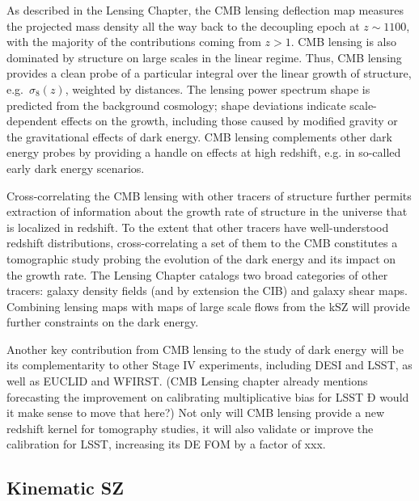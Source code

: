 As described in the Lensing Chapter, the CMB lensing deflection map measures the projected mass density all the way back to the decoupling epoch at $z \sim 1100$, with the majority of the contributions coming from $z > 1$.  CMB lensing is also dominated by structure on large scales in the linear regime.  Thus,  CMB lensing provides a clean probe of a particular integral over the linear growth of structure,
e.g.~$\sigma_8(z)$,
weighted by distances. The lensing power spectrum shape is predicted from the background cosmology; shape deviations indicate scale-dependent effects on the growth, including those caused by modified gravity or the 
gravitational effects of dark energy.  CMB lensing complements other dark energy probes by providing
a handle on effects at high redshift, e.g. in so-called early dark energy scenarios.

Cross-correlating the CMB lensing with other tracers of structure further permits extraction of information about the growth rate of structure in the universe that is localized in redshift.  To the extent that other tracers have well-understood redshift distributions, cross-correlating a set of them to the CMB constitutes a tomographic study probing the evolution of the dark energy and its impact on the growth rate. The Lensing Chapter catalogs two broad categories of other tracers: galaxy density fields (and by extension the CIB) and galaxy shear maps. Combining lensing maps with maps of large scale flows from the kSZ will provide further constraints on the dark energy.

Another key contribution from CMB lensing to the study of dark energy will be its complementarity to other Stage IV experiments, including DESI and LSST, as well as EUCLID and WFIRST. (CMB Lensing chapter already mentions forecasting the improvement on calibrating multiplicative bias for LSST Ð would it make sense to move that here?) Not only will CMB lensing provide a new redshift kernel for tomography studies, it will also validate or improve the calibration for LSST, increasing its DE FOM by a factor of xxx.




\subsection{Kinematic SZ}

